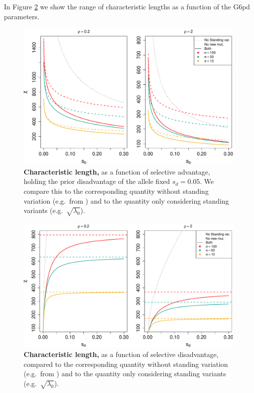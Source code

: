 \documentclass{article}
\begin{document}
In Figure \ref{Fig-G6PD-charlength} we show the range of characteristic lengths as a function 
of the G6pd parameters. 

\begin{figure}[ht]
\begin{center}
  \includegraphics[width=1.0\textwidth]{G6PD_charlengths_sb}   %
\caption{ %
{\bf Characteristic length,} as a function of selective advantage,
holding the prior disadvantage of the allele fixed $s_d=0.05$. 
We compare this to the corresponding quantity without standing variation (e.g.\ from \cite{ralphcoop2010}) and to the quantity only considering standing variants (e.g.\ $\sqrt{\lambda_0}$).
} \label{Fig-G6PD-charlength-sb}
\end{center}
\end{figure}


\begin{figure}[ht]
\begin{center}
  \includegraphics[width=1.0\textwidth]{G6PD_charlengths}   %
\caption{ %
{\bf Characteristic length,} as a function of selective disadvantage, compared to the corresponding quantity without standing variation (e.g.\ from \cite{ralphcoop2010}) and to the quantity only considering standing variants (e.g.\ $\sqrt{\lambda_0}$).
} \label{Fig-G6PD-charlength}
\end{center}
\end{figure}
\end{document}
